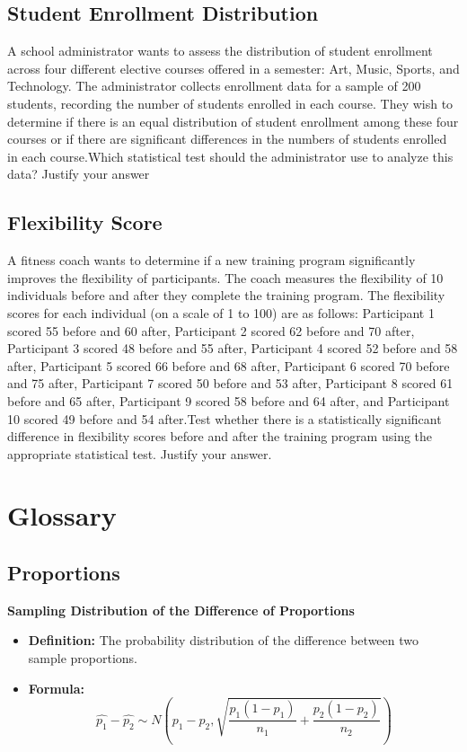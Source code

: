 \documentclass{article}
\begin{document}
\subsection*{Student Enrollment Distribution}
A school administrator wants to assess the distribution of student enrollment across four different elective courses offered in a semester: Art, Music, Sports, and Technology. The administrator collects enrollment data for a sample of 200 students, recording the number of students enrolled in each course. They wish to determine if there is an equal distribution of student enrollment among these four courses or if there are significant differences in the numbers of students enrolled in each course.Which statistical test should the administrator use to analyze this data?
Justify your answer



\subsection*{Flexibility Score}
A fitness coach wants to determine if a new training program significantly improves the flexibility of participants. The coach measures the flexibility of 10 individuals before and after they complete the training program. The flexibility scores for each individual (on a scale of 1 to 100) are as follows: Participant 1 scored 55 before and 60 after, Participant 2 scored 62 before and 70 after, Participant 3 scored 48 before and 55 after, Participant 4 scored 52 before and 58 after, Participant 5 scored 66 before and 68 after, Participant 6 scored 70 before and 75 after, Participant 7 scored 50 before and 53 after, Participant 8 scored 61 before and 65 after, Participant 9 scored 58 before and 64 after, and Participant 10 scored 49 before and 54 after.Test whether there is a statistically significant difference in flexibility scores before and after the training program using the appropriate statistical test.
Justify your answer.


\section*{Glossary}

\subsection*{Proportions}

\textbf{Sampling Distribution of the Difference of Proportions}
\begin{itemize}
    \item \textbf{Definition:} The probability distribution of the difference between two sample proportions.
    \item \textbf{Formula:}
    \[
    \hat{p_1} - \hat{p_2} \sim N\left(p_1 - p_2, \sqrt{\frac{p_1(1-p_1)}{n_1} + \frac{p_2(1-p_2)}{n_2}}\right)
    \]
\end{itemize}
\end{document}
